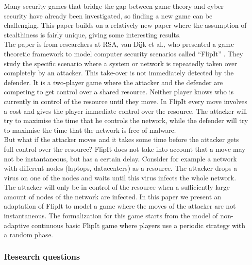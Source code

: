 Many security games that bridge the gap between game theory and cyber security have already been investigated, so finding a new game can be challenging. This paper builds on a relatively new paper where the assumption of stealthiness is fairly unique, giving some interesting results.\\ 
 The paper is from researchers at RSA, van Dijk et al.,  who presented a game-theoretic framework to model computer security scenarios called ``FlipIt'' \cite{FlipIt}. They study the specific scenario where a system or network is repeatedly taken over completely by an attacker. This take-over is not immediately detected by the defender. It is a two-player game where the attacker and the defender are competing to get control over a shared resource. Neither player knows who is currently in control of the resource until they move. In FlipIt every move involves a cost and gives the player immediate control over the resource. The attacker will try to maximise the time that he controls the network, while the defender will try to maximise the time that the network is free of malware. \\
 But what if the attacker moves and it takes some time before the attacker gets full control over the resource? FlipIt does not take into account that a move may not be instantaneous, but has a certain delay. Consider for example a network with different nodes (laptops, datacenters) as a resource. The attacker drops a virus on one of the nodes and waits until this virus infects the whole network. The attacker will only be in control of the resource when a sufficiently large amount of nodes of the network are infected. In this paper we present an adaptation of FlipIt to model a game where the moves of the attacker are not instantaneous. The formalization for this game starts from the model of non-adaptive continuous basic FlipIt game where players use a periodic strategy with a random phase.   \\

\subsubsection{Research questions}


